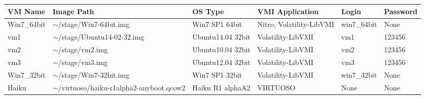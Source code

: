 \documentclass[11pt, oneside]{Thesis} %
\begin{document}
\clearpage %
\begin{center}
    \begin{tabular}{| p{2cm} |p{3cm} | p{2cm} | p{2cm} |p{2cm} |p{2cm}|}
    \hline
    VM Name & Image Path & OS Type & VMI Application & Login & Password  \\ 
    \hline
    Win7\_64bit & $\sim$/stage/Win7-64bit.img & Win7 SP1 64bit & Nitro, Volatility-LibVMI & win7\_64bit & None\\ 
    \hline
    vm1 & $\sim$/stage/Ubuntu14-02-32.img & Ubuntu14.04 32bit &Volatility-LibVMI & vm1 & 123456\\
    \hline
    vm2 & $\sim$/stage/vm2.img & Ubuntu10.04 32bit &Volatility-LibVMI & vm2 & 123456\\
    \hline
    vm3 & $\sim$/stage/vm3.img & Ubuntu12.04 32bit &Volatility-LibVMI & vm3 & 123456\\
    \hline
    Win7\_32bit & $\sim$/stage/Win7-32bit.img & Win7 SP1 32bit & Volatility-LibVMI & win7\_32bit & None\\
    \hline
    Haiku & $\sim$/virtuoso/haiku-r1alpha2-anyboot.qcow2 & Haiku R1 alphaA2 & VIRTUOSO & None & None\\ 
    \hline
    \end{tabular}
\end{center}



\mainmatter %

\pagestyle{fancy} %



 

 
 
 



\end{document}
